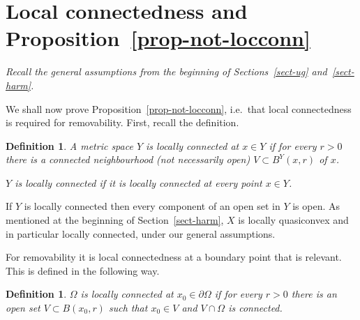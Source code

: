 \documentclass[a4paper,twoside]{article}
\theoremstyle{propositional}
\theoremstyle{descriptive}
\newtheorem{deff}[thm]{Definition}
\theoremstyle{remarkstyle}
\newcommand{\bdry}{\partial}
\newcommand{\bdy}{\bdry}
\newcommand{\Om}{\Omega}
\numberwithin{equation}{section}
\begin{document}
\section{Local connectedness and 
Proposition~\ref{prop-not-locconn}}
\label{sect-loc-conn}

\emph{Recall the general assumptions from the beginning of Sections~\ref{sect-ug}
and~\ref{sect-harm}.}

\medskip

We shall now prove
Proposition~\ref{prop-not-locconn}, i.e.\ 
that local connectedness is required for removability.
First, recall the definition.

\begin{deff} \label{deff-lc}
A metric space $Y$ is \emph{locally connected at $x\in Y$}
if for every $r>0$ there is a connected neighbourhood
(not necessarily open) $V \subset B^Y(x,r)$ of $x$.

$Y$ is \emph{locally connected} if it is locally connected at
every point $x \in Y$.
\end{deff}

If $Y$ is locally connected then every component of an open set
in $Y$ is open.
As mentioned at the beginning of Section~\ref{sect-harm}, 
$X$ is  locally quasiconvex and in particular locally connected,
under our general assumptions.

For removability it is local connectedness at a boundary point
that is relevant. This is defined in the following way.


\begin{deff}\label{deff-loc-conn-bdy}
$\Om$ is \emph{locally connected at $x_0\in \bdy \Om$} if
for every $r>0$ there is an open set $V\subset B(x_0,r)$ 
such that $x_0 \in V$
and $V \cap \Om$ is connected.
\end{deff}
\end{document}
